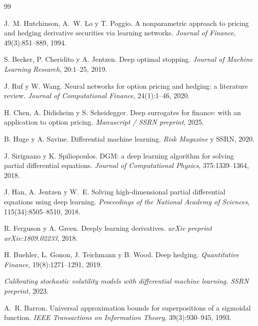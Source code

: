 \documentclass[11pt,a4paper]{article}
\begin{document}
\begin{thebibliography}{99}

J.~M. Hutchinson, A.~W. Lo y T. Poggio.
\newblock A nonparametric approach to pricing and hedging derivative securities via learning networks.
\newblock \emph{Journal of Finance}, 49(3):851--889, 1994.

S. Becker, P. Cheridito y A. Jentzen.
\newblock Deep optimal stopping.
\newblock \emph{Journal of Machine Learning Research}, 20:1--25, 2019.

J. Ruf y W. Wang.
\newblock Neural networks for option pricing and hedging: a literature review.
\newblock \emph{Journal of Computational Finance}, 24(1):1--46, 2020.

H. Chen, A. Didisheim y S. Scheidegger.
\newblock Deep surrogates for finance: with an application to option pricing.
\newblock \emph{Manuscript / SSRN preprint}, 2025.

B. Huge y A. Savine.
\newblock Differential machine learning.
\newblock \emph{Risk Magazine} y SSRN, 2020.

J. Sirignano y K. Spiliopoulos.
\newblock DGM: a deep learning algorithm for solving partial differential equations.
\newblock \emph{Journal of Computational Physics}, 375:1339--1364, 2018.

J. Han, A. Jentzen y W.~E.
\newblock Solving high-dimensional partial differential equations using deep learning.
\newblock \emph{Proceedings of the National Academy of Sciences}, 115(34):8505--8510, 2018.

R. Ferguson y A. Green.
\newblock Deeply learning derivatives.
\newblock \emph{arXiv preprint arXiv:1809.02233}, 2018.

H. Buehler, L. Gonon, J. Teichmann y B. Wood.
\newblock Deep hedging.
\newblock \emph{Quantitative Finance}, 19(8):1271--1291, 2019.

\emph{Calibrating stochastic volatility models with differential machine learning.}
\newblock \emph{SSRN preprint}, 2023.

A.~R. Barron.
\newblock Universal approximation bounds for superpositions of a sigmoidal function.
\newblock \emph{IEEE Transactions on Information Theory}, 39(3):930--945, 1993.


\end{thebibliography}
\end{document}
